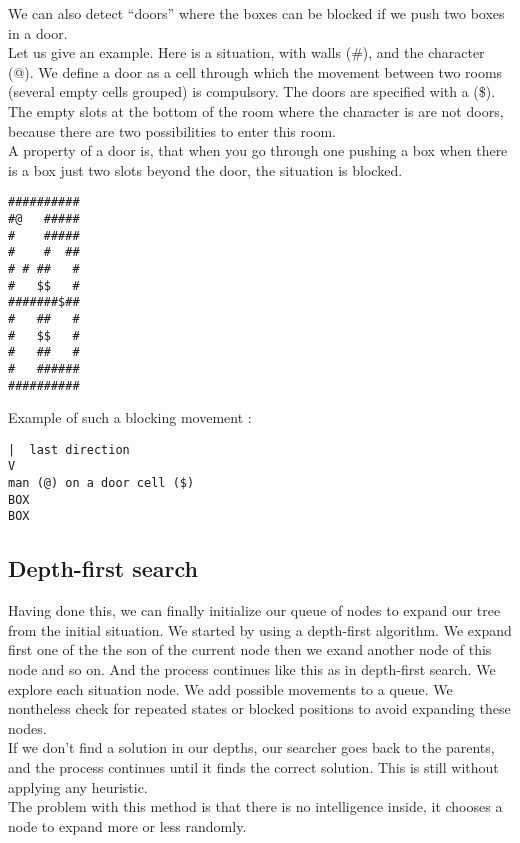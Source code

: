 \documentclass[journal]{IEEEtran}
\begin{document}
\vspace*{.5 cm}

We can also detect ``doors'' where the boxes can be blocked if we push two
boxes in a door.\\

Let us give an example. Here is a situation, with walls ($\#$), and the
character (@). We define a door as a cell through which the movement between
two rooms (several empty cells grouped) is compulsory. The doors are
specified with a (\$). The empty slots at the bottom of the room where the
character is are not doors, because there are two possibilities to enter
this room. \\

A property of a door is, that when you go through one pushing a box when
there is a box just two slots beyond the door, the situation is blocked.

\begin{verbatim}
##########
#@   #####
#    #####
#    #  ##
# # ##   #
#   $$   #
#######$##
#   ##   #
#   $$   #
#   ##   #
#   ######
##########
\end{verbatim}

Example of such a blocking movement :

\begin{verbatim}
|  last direction
V
man (@) on a door cell ($)
BOX
BOX
\end{verbatim}



\subsection{Depth-first search}
Having done this, we can finally initialize our queue of nodes to expand our tree from the initial situation. We started by using a depth-first algorithm. We expand first one of the the son of the current node then we exand another node of this node and so on. And the process continues like this as in depth-first search. We explore each situation node. We add possible movements to a queue. We nontheless check for repeated states or blocked positions to avoid expanding these nodes.
\\
If we don't find a solution in our depths, our searcher goes back to the parents, and the process continues until it finds the correct solution. This is still without applying any heuristic.
\\
The problem with this method is that there is no intelligence inside, it chooses a node to expand more or less randomly.
\end{document}
